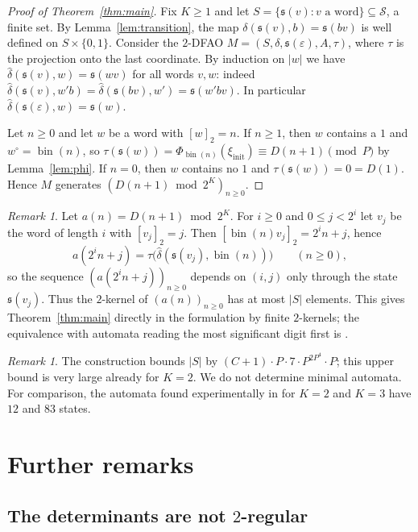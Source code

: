 \documentclass{amsart}
\theoremstyle{definition}
\theoremstyle{remark}
\newtheorem{remark}[theorem]{Remark}
\numberwithin{equation}{section}
\newcommand{\val}[1]{[#1]_2}
\newcommand{\bin}{\operatorname{bin}}
\newcommand{\st}{\mathfrak{s}}
\begin{document}
\begin{proof}[Proof of Theorem~\ref{thm:main}]
Fix $K\ge1$ and let $S=\{\st(v):v\text{ a word}\}\subseteq\mathcal S$, a finite set. By Lemma~\ref{lem:transition}, the map $\delta(\st(v),b)=\st(bv)$ is well defined on $S\times\{0,1\}$. Consider the $2$-DFAO $M=(S,\delta,\st(\varepsilon),A,\tau)$, where $\tau$ is the projection onto the last coordinate. By induction on $|w|$ we have $\hat\delta(\st(v),w)=\st(wv)$ for all words $v,w$: indeed $\hat\delta(\st(v),w'b)=\hat\delta(\st(bv),w')=\st(w'bv)$. In particular $\hat\delta(\st(\varepsilon),w)=\st(w)$.

Let $n\ge0$ and let $w$ be a word with $\val{w}=n$. If $n\ge1$, then $w$ contains a $1$ and $w^\circ=\bin(n)$, so $\tau(\st(w))=\Phi_{\bin(n)}(\xi_{\mathrm{init}})\equiv D(n+1)\pmod P$ by Lemma~\ref{lem:phi}. If $n=0$, then $w$ contains no $1$ and $\tau(\st(w))=0=D(1)$. Hence $M$ generates $(D(n+1)\bmod 2^K)_{n\ge0}$.
\end{proof}

\begin{remark}\label{rem:kernel}
Let $a(n)=D(n+1)\bmod 2^K$. For $i\ge0$ and $0\le j<2^i$ let $v_j$ be the word of length $i$ with $\val{v_j}=j$. Then $\val{\bin(n)v_j}=2^in+j$, hence
\[
a(2^in+j)=\tau\bigl(\hat\delta(\st(v_j),\bin(n))\bigr)\qquad(n\ge0),
\]
so the sequence $(a(2^in+j))_{n\ge0}$ depends on $(i,j)$ only through the state $\st(v_j)$. Thus the $2$-kernel of $(a(n))_{n\ge0}$ has at most $|S|$ elements. This gives Theorem~\ref{thm:main} directly in the formulation by finite $2$-kernels; the equivalence with automata reading the most significant digit first is \cite[Section~5.2]{AS}.
\end{remark}

\begin{remark}\label{rem:size}
The construction bounds $|S|$ by $(C+1)\cdot P\cdot 7\cdot P^{2P^4}\cdot P$; this upper bound is very large already for $K=2$. We do not determine minimal automata. For comparison, the automata found experimentally in \cite{SU} for $K=2$ and $K=3$ have $12$ and $83$ states.
\end{remark}

\section{Further remarks}\label{sec:remarks}

\subsection{The determinants are not \texorpdfstring{$2$}{2}-regular}
\end{document}
